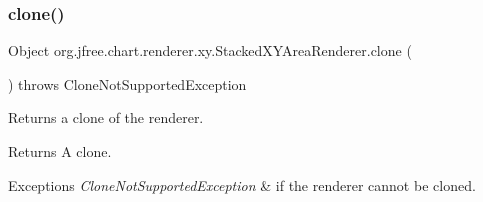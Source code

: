\subsubsection{\texorpdfstring{clone()}{clone()}}
{\footnotesize\ttfamily Object org.\+jfree.\+chart.\+renderer.\+xy.\+Stacked\+X\+Y\+Area\+Renderer.\+clone (\begin{DoxyParamCaption}{ }\end{DoxyParamCaption}) throws Clone\+Not\+Supported\+Exception}

Returns a clone of the renderer.

\begin{DoxyReturn}{Returns}
A clone.
\end{DoxyReturn}

\begin{DoxyExceptions}{Exceptions}
{\em Clone\+Not\+Supported\+Exception} & if the renderer cannot be cloned. \\
\hline
\end{DoxyExceptions}
\mbox{\label{classorg_1_1jfree_1_1chart_1_1renderer_1_1xy_1_1_stacked_x_y_area_renderer_a5cf251068f60f406db8d44f4a6d783eb}} 
